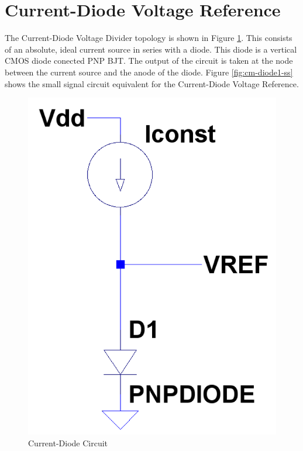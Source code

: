 \documentclass[conference]{IEEEtran}
\begin{document}
\section{Current-Diode Voltage Reference}
The Current-Diode Voltage Divider topology is shown in Figure \ref{fig:cm-diode1}.  This consists of an absolute, ideal current source in series with a diode.  This diode is a vertical CMOS diode conected PNP BJT.  The output of the circuit is taken at the node between the current source and the anode of the diode.  Figure \ref{fig:cm-diode1-ss} shows the small signal circuit equivalent for the Current-Diode Voltage Reference.
\begin{figure}[!htbp]
  \centering
  \includegraphics[scale=0.25]{images/cm-diode1.png}
  \caption[cm-diode1]{Current-Diode Circuit}
  \label{fig:cm-diode1}
\end{figure}
\end{document}
